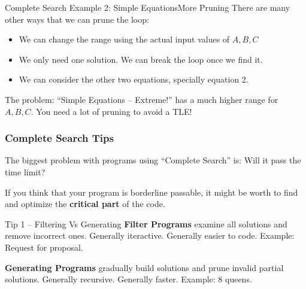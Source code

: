 \begin{frame}{Complete Search Example 2: Simple Equations}{More Pruning}
  There are many other ways that we can prune the loop:

  \medskip

  \begin{itemize}
  \item We can change the range using the actual input values of $A,B,C$
  \item We only need one solution. We can break the loop once we find it.
  \item We can consider the other two equations, specially equation 2.
  \end{itemize}

  \vfill

  \begin{alertblock}{}
    The problem: ``Simple Equations -- Extreme!'' has a much
    higher range for $A,B,C$. You need a lot of pruning to avoid a TLE!
  \end{alertblock}
\end{frame}

\begin{frame}
  \frametitle{Complete Search Tips}
  The biggest problem with programs using ``Complete Search'' is: Will it pass the time limit?
  \medskip

  If you think that your program is borderline passable, it might be
  worth to find and optimize the {\bf critical part} of the code.
  \vfill

  \begin{block}{Tip 1 -- Filtering Vs Generating}
    {\bf Filter Programs} examine all solutions and remove
    incorrect ones. Generally iteractive. Generally easier to
    code. Example: Request for proposal.

    \bigskip

    {\bf Generating Programs} gradually build solutions and
    prune invalid partial solutions. Generally recursive. Generally
    faster. Example: 8 queens.
  \end{block}
\end{frame}

